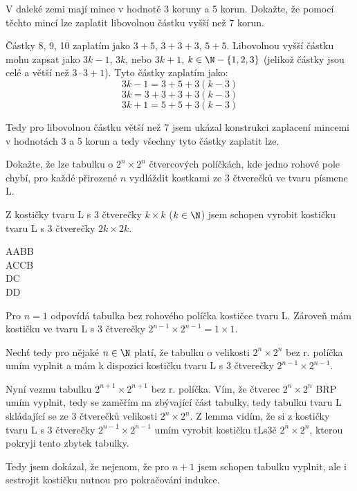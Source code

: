 \documentclass[12pt]{article}					%
\begin{document}
    
\begin{priklad}[1]
    V daleké zemi mají mince v hodnotě 3 koruny a 5 korun. Dokažte, že pomocí těchto mincí lze zaplatit libovolnou částku vyšší než 7 korun. 
    \begin{dukazin}[přímý]
        Částky 8, 9, 10 zaplatím jako $3+5$, $3+3+3$, $5+5$. Libovolnou vyšší částku mohu zapsat jako $3k-1$, $3k$, nebo $3k + 1$, $k \in \N - \{1, 2, 3\}$ (jelikož částky jsou celé a větší než $3\cdot 3 + 1$). Tyto částky zaplatím jako:
        $$3k-1 = 3 + 5 + 3(k-3)$$
        $$ 3k = 3 + 3 + 3 + 3(k-3) $$ 
        $$ 3k + 1 = 5 + 5 + 3(k-3) $$ 

        Tedy pro libovolnou částku větší než 7 jsem ukázal konstrukci zaplacení mincemi v hodnotách 3 a 5 korun a tedy všechny tyto částky zaplatit lze.
    \end{dukazin}
\end{priklad}

\newpage

\begin{priklad}[2]
    Dokažte, že lze tabulku o $2^n \times 2^n$ čtvercových políčkách, kde jedno rohové pole chybí, pro každé přirozené $n$ vydláždit kostkami ze 3 čtverečků ve tvaru písmene L. 


        \begin{lemmain*}
            Z kostičky tvaru L s 3 čtverečky $k\times k$ ($k \in \N$) jsem schopen vyrobit kostičku tvaru L s 3 čtverečky $2k\times 2k$.
            \begin{dukazin}[Konstrukcí]
                \noindent AABB\\
                ACCB\\
                DC\\
                DD
            \end{dukazin}
        \end{lemmain*}

    \begin{dukazin}
        Pro $n = 1$ odpovídá tabulka bez rohového políčka kostičce tvaru L. Zároveň mám kostičku ve tvaru L s 3 čtverečky $2^{n-1}\times 2^{n-1} = 1\times 1$.

        Nechť tedy pro nějaké $n \in \N$ platí, že tabulku o velikosti $2^n \times 2^n$ bez r. políčka umím vyplnit a mám k dispozici kostičku tvaru L s 3 čtverečky $2^{n-1}\times 2^{n-1}$.

        Nyní vezmu tabulku $2^{n+1}\times 2^{n+1}$ bez r. políčka. Vím, že čtverec $2^n\times 2^n$ BRP umím vyplnit, tedy se zaměřím na zbývající část tabulky, tedy tabulku tvaru L skládající se ze 3 čtverečků velikosti $2^n\times 2^n$. Z lemma vidím, že si z kostičky tvaru L s 3 čtverečky $2^{n-1}\times 2^{n-1}$ umím vyrobit kostičku tLs3č $2^n\times 2^n$, kterou pokryji tento zbytek tabulky.

        Tedy jsem dokázal, že nejenom, že pro $n+1$ jsem schopen tabulku vyplnit, ale i sestrojit kostičku nutnou pro pokračování indukce.
    \end{dukazin}
\end{priklad}
\end{document}
